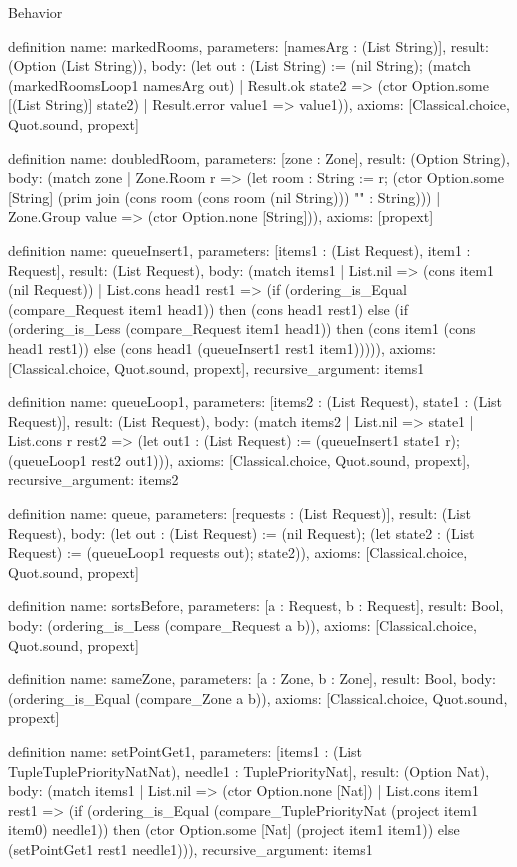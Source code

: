 \begin{lexlean}{Behavior}
\begin{semanticmodule}
definition{
  name: markedRooms,
  parameters: [namesArg : (List String)],
  result: (Option (List String)),
  body: (let out : (List String) := (nil String); (match (markedRoomsLoop1 namesArg out)
    | Result.ok state2 => (ctor Option.some [(List String)] state2)
    | Result.error value1 => value1)),
  axioms: [Classical.choice, Quot.sound, propext]
}

definition{
  name: doubledRoom,
  parameters: [zone : Zone],
  result: (Option String),
  body: (match zone
    | Zone.Room r => (let room : String := r; (ctor Option.some [String] (prim join (cons room (cons room (nil String))) "" : String)))
    | Zone.Group value => (ctor Option.none [String])),
  axioms: [propext]
}

definition{
  name: queueInsert1,
  parameters: [items1 : (List Request), item1 : Request],
  result: (List Request),
  body: (match items1
    | List.nil => (cons item1 (nil Request))
    | List.cons head1 rest1 => (if (ordering_is_Equal (compare_Request item1 head1)) then (cons head1 rest1) else (if (ordering_is_Less (compare_Request item1 head1)) then (cons item1 (cons head1 rest1)) else (cons head1 (queueInsert1 rest1 item1))))),
  axioms: [Classical.choice, Quot.sound, propext],
  recursive_argument: items1
}

definition{
  name: queueLoop1,
  parameters: [items2 : (List Request), state1 : (List Request)],
  result: (List Request),
  body: (match items2
    | List.nil => state1
    | List.cons r rest2 => (let out1 : (List Request) := (queueInsert1 state1 r); (queueLoop1 rest2 out1))),
  axioms: [Classical.choice, Quot.sound, propext],
  recursive_argument: items2
}

definition{
  name: queue,
  parameters: [requests : (List Request)],
  result: (List Request),
  body: (let out : (List Request) := (nil Request); (let state2 : (List Request) := (queueLoop1 requests out); state2)),
  axioms: [Classical.choice, Quot.sound, propext]
}

definition{
  name: sortsBefore,
  parameters: [a : Request, b : Request],
  result: Bool,
  body: (ordering_is_Less (compare_Request a b)),
  axioms: [Classical.choice, Quot.sound, propext]
}

definition{
  name: sameZone,
  parameters: [a : Zone, b : Zone],
  result: Bool,
  body: (ordering_is_Equal (compare_Zone a b)),
  axioms: [Classical.choice, Quot.sound, propext]
}

definition{
  name: setPointGet1,
  parameters: [items1 : (List TupleTuplePriorityNatNat), needle1 : TuplePriorityNat],
  result: (Option Nat),
  body: (match items1
    | List.nil => (ctor Option.none [Nat])
    | List.cons item1 rest1 => (if (ordering_is_Equal (compare_TuplePriorityNat (project item1 item0) needle1)) then (ctor Option.some [Nat] (project item1 item1)) else (setPointGet1 rest1 needle1))),
  recursive_argument: items1
}


\end{semanticmodule}
\end{lexlean}
